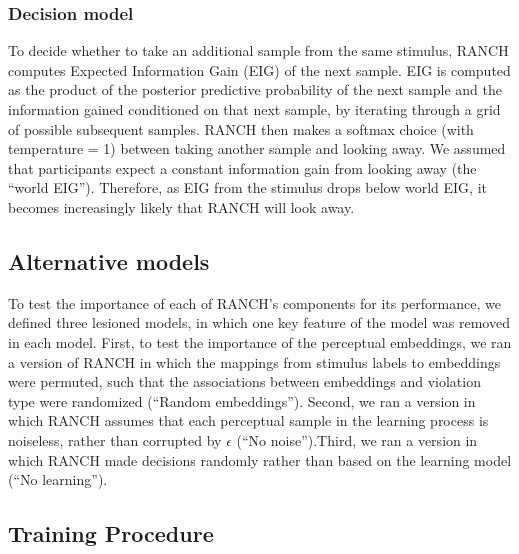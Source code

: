 \documentclass[10pt, letterpaper]{article}
\begin{document}
\hypertarget{decision-model}{%
\subsubsection{Decision model}\label{decision-model}}

To decide whether to take an additional sample from the same stimulus,
RANCH computes Expected Information Gain (EIG) of the next sample. EIG
is computed as the product of the posterior predictive probability of
the next sample and the information gained conditioned on that next
sample, by iterating through a grid of possible subsequent samples.
RANCH then makes a softmax choice (with temperature = 1) between taking
another sample and looking away. We assumed that participants expect a
constant information gain from looking away (the ``world EIG'').
Therefore, as EIG from the stimulus drops below world EIG, it becomes
increasingly likely that RANCH will look away.

\hypertarget{alternative-models}{%
\subsection{Alternative models}\label{alternative-models}}

To test the importance of each of RANCH's components for its
performance, we defined three lesioned models, in which one key feature
of the model was removed in each model. First, to test the importance of
the perceptual embeddings, we ran a version of RANCH in which the
mappings from stimulus labels to embeddings were permuted, such that the
associations between embeddings and violation type were randomized
(``Random embeddings''). Second, we ran a version in which RANCH assumes
that each perceptual sample in the learning process is noiseless, rather
than corrupted by \(\epsilon\) (``No noise'').Third, we ran a version in
which RANCH made decisions randomly rather than based on the learning
model (``No learning'').

\hypertarget{training-procedure}{%
\subsection{Training Procedure}\label{training-procedure}}
\end{document}
